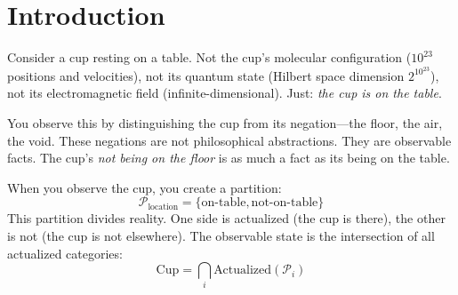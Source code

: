 \documentclass[twocolumn,10pt]{article}
\theoremstyle{definition}
\theoremstyle{remark}
\newcommand{\bigO}{\mathcal{O}}
\begin{document}
\begin{abstract}
\vspace{0.2cm}
\noindent\textbf{Contributions.} (1) Proof that bounded phase space admits finite ternary partition structure (Section~\ref{sec:foundations}). (2) Derivation of S-entropy coordinates from first principles (Section~\ref{sec:entropy_coords}). (3) Proof of $\bigO(\log M)$ backward navigation complexity (Section~\ref{sec:backward_nav}). (4) Identification of Gödelian residue with thermodynamic gap (Section~\ref{sec:residue}). (5) Resolution of P vs NP via operational distinction (Section~\ref{sec:complexity}). (6) Derivation of thermodynamic security (Section~\ref{sec:security}). (7) Experimental validation via program synthesis (Section~\ref{sec:synthesis}). (8) Universal framework applicable to any bounded system (Section~\ref{sec:universality}).

\vspace{0.3cm}
\noindent\textbf{Keywords:} backward trajectory completion, bounded phase space, S-entropy, partition theory, Gödelian residue, recognition, P vs NP, thermodynamic security, Poincaré computing, computational foundations

\end{abstract}

\section{Introduction}
\label{sec:introduction}

Consider a cup resting on a table. Not the cup's molecular configuration ($10^{23}$ positions and velocities), not its quantum state (Hilbert space dimension $2^{10^{23}}$), not its electromagnetic field (infinite-dimensional). Just: \textit{the cup is on the table}.

\vspace{0.2cm}
\noindent You observe this by distinguishing the cup from its negation—the floor, the air, the void. These negations are not philosophical abstractions. They are observable facts. The cup's \textit{not being on the floor} is as much a fact as its being on the table.

\vspace{0.2cm}
\noindent When you observe the cup, you create a partition:
\begin{equation}
\mathcal{P}_{\text{location}} = \{\text{on-table}, \text{not-on-table}\}
\end{equation}
This partition divides reality. One side is actualized (the cup is there), the other is not (the cup is not elsewhere). The observable state is the intersection of all actualized categories:
\begin{equation}
\text{Cup} = \bigcap_{i} \text{Actualized}(\mathcal{P}_i)
\end{equation}
\end{document}

